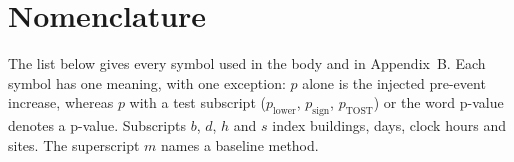 
\appendix

\section{Nomenclature}\label{app:nomenclature}

The list below gives every symbol used in the body and in Appendix~B. Each symbol has one meaning, with one exception: $p$ alone is the injected pre-event increase, whereas $p$ with a test subscript ($p_{\mathrm{lower}}$, $p_{\mathrm{sign}}$, $p_{\mathrm{TOST}}$) or the word p-value denotes a p-value. Subscripts $b$, $d$, $h$ and $s$ index buildings, days, clock hours and sites. The superscript $m$ names a baseline method.

